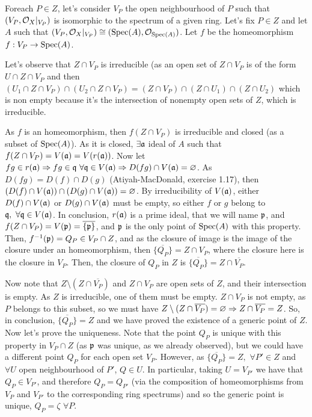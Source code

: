 \begin{sol}
	Foreach $P \in Z$, let's consider $V_P$ the open neighbourhood of $P$ such that $(V_P, \mathcal{O}_X|_{V_P})$ is isomorphic to the spectrum of a given ring. Let's fix $P \in Z$ and let $A$ such that $(V_P, \mathcal{O}_X|_{V_P}) \cong (\mathrm{Spec}(A), \mathcal{O}_{\mathrm{Spec}(A)})$. Let $f$ be the homeomorphism $f: V_P \to \mathrm{Spec}(A)$.

	Let's observe that $Z \cap V_P$ is irreducible (as an open set of $Z \cap V_P$ is of the form $U \cap Z \cap V_P$ and then $(U_1 \cap Z \cap V_P) \cap (U_2 \cap Z \cap V_P) = (Z \cap V_P) \cap (Z \cap U_1) \cap (Z \cap U_2)$ which is non empty because it's the intersection of nonempty open sets of $Z$, which is irreducible.

	As $f$ is an homeomorphism, then $f(Z\cap V_P)$ is irreducible and closed (as a subset of $\mathrm{Spec}(A)$). As it is closed, $\exists \mathfrak{a}$ ideal of $A$ such that $f(Z \cap V_P) = V(\mathfrak{a}) = V(r(\mathfrak{a}))$. Now let $fg \in r(\mathfrak{a}) \Rightarrow fg \in \mathfrak{q} \, \, \forall \mathfrak{q} \in V(\mathfrak{a}) \Rightarrow D(fg) \cap V(\mathfrak{a}) = \varnothing$. As $D(fg) = D(f) \cap D(g)$ (Atiyah-MacDonald, exercise 1.17), then $(D(f) \cap V(\mathfrak{a})) \cap (D(g) \cap V(\mathfrak{a})) = \varnothing$. By irreducibility of $V(\mathfrak{a})$, either $D(f) \cap V(\mathfrak{a})$ or $D(g) \cap V(\mathfrak{a})$ must be empty, so either $f$ or $g$ belong to $\mathfrak{q}, \, \, \forall \mathfrak{q} \in V(\mathfrak{a})$. In conclusion, $r(\mathfrak{a})$ is a prime ideal, that we will name $\mathfrak{p}$, and $f(Z \cap V_P) = V(\mathfrak{p}) = \overline{\{\mathfrak{p}\}}$, and $\mathfrak{p}$ is the only point of $\mathrm{Spec}(A)$ with this property. Then, $f^{-1}(\mathfrak{p}) = Q_P \in V_P \cap Z$, and as the closure of image is the image of the closure under an homeomorphism, then $\overline{\{Q_P\}} = Z \cap V_P$, where the closure here is the closure in $V_P$. Then, the closure of $Q_P$ in $Z$ is $\overline{\{Q_P\}} = Z \cap \overline{V_P}$.

	Now note that $Z \setminus (Z \cap \overline{V_P})$ and $Z \cap V_P$ are open sets of $Z$, and their intersection is empty. As $Z$ is irreducible, one of them must be empty. $Z \cap V_P$ is not empty, as $P$ belongs to this subset, so we must have $Z \setminus (Z \cap \overline{V_P}) = \varnothing \Rightarrow Z \cap \overline{V_P} = Z$. So, in conclusion, $\overline{\{Q_P\}} = Z$ and we have proved the existence of a generic point of $Z$. Now let's prove the uniqueness. Note that the point $Q_P$ is unique with this property in $V_P \cap Z$ (as $\mathfrak{p}$ was unique, as we already observed), but we could have a different point $Q_P$ for each open set $V_P$. However, as $\overline{\{Q_P\}} = Z, \, \, \forall P' \in Z$ and $\forall U$ open neighbourhood of $P'$, $Q \in U$. In particular, taking $U = V_{P'}$ we have that $Q_P \in V_{P'}$, and therefore $Q_P = Q_{P'}$ (via the composition of homeomorphisms from $V_P$ and $V_{P'}$ to the corresponding ring spectrums) and so the generic point is unique, $Q_P = \zeta \, \, \forall P$.
\end{sol}


